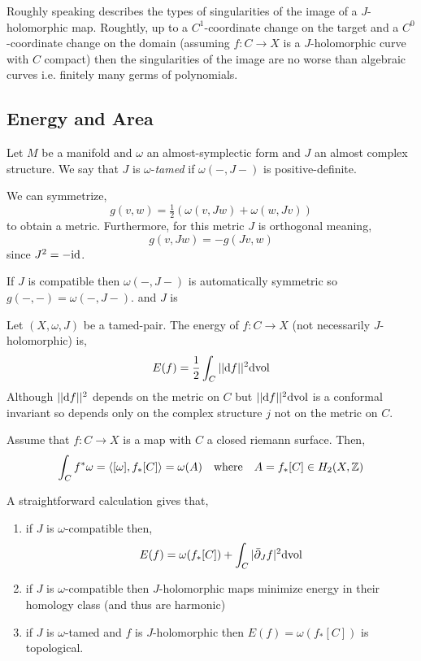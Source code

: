 \documentclass[12pt]{article}
\newcommand{\dbar}{\bar{\partial}}
\begin{document}
\begin{thm}
Roughly speaking describes the types of singularities of the image of a $J$-holomorphic map. Roughtly, up to a $C^1$-coordinate change on the target and a $C^0$-coordinate change on the domain (assuming $f : C \to X$ is a $J$-holomorphic curve with $C$ compact) then the singularities of the image are no worse than algebraic curves i.e. finitely many germs of polynomials. 
\end{thm}

\subsection{Energy and Area}

\begin{defn}
Let $M$ be a manifold and $\omega$ an almost-symplectic form and $J$ an almost complex structure. We say that $J$ is $\omega$-\textit{tamed} if $\omega(-,J-)$ is positive-definite.
\end{defn}

\begin{rmk}
We can symmetrize,
\[ g(v,w) = \tfrac{1}{2} (\omega(v, Jw) + \omega(w, Jv)) \]
to obtain a metric. Furthermore, for this metric $J$ is orthogonal meaning,
\[ g(v, Jw) = -g(Jv, w) \]
since $J^2 = - \mathrm{id}$. 
\end{rmk}

\begin{rmk}
If $J$ is compatible then $\omega(-,J-)$ is automatically symmetric so $g(-,-) = \omega(-,J-)$.
and $J$ is 
\end{rmk}

\begin{defn}
Let $(X, \omega, J)$ be a tamed-pair. The energy of $f : C \to X$ (not necessarily $J$-holomorphic) is,
\[ E(f) = \frac{1}{2} \int_C ||\mathrm{d}{f}||^2 \mathrm{d}{\mathrm{vol}} \]
Although $||\mathrm{d}{f}||^2$ depends on the metric on $C$ but $||\mathrm{d}{f}||^2 \mathrm{d}{\mathrm{vol}}$ is a conformal invariant so depends only on the complex structure $j$ not on the metric on $C$. 
\end{defn}

Assume that $f : C \to X$ is a map with $C$ a closed riemann surface. Then,
\[ \int_C f^* \omega = \left< [\omega], f_*[C] \right> = \omega(A) \quad \text{where} \quad A = f_* [C] \in H_2(X, \mathbb{Z}) \]

\begin{prop}
A straightforward calculation gives that,
\begin{enumerate}
\item if $J$ is $\omega$-compatible then,
\[ E(f) = \omega(f_* [C]) + \int_C | \dbar_J f|^2 \d{\mathrm{vol}} \]
\item if $J$ is $\omega$-compatible then $J$-holomorphic maps minimize energy in their homology class (and thus are harmonic)
\item if $J$ is $\omega$-tamed and $f$ is $J$-holomorphic then $E(f) = \omega(f_* [C])$ is topological.
\end{enumerate}
\end{prop}
\end{document}
